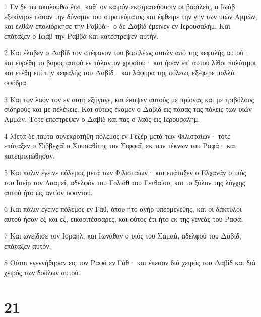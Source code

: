 \par 1 Εν δε τω ακολούθω έτει, καθ' ον καιρόν εκστρατεύουσιν οι βασιλείς, ο Ιωάβ εξεκίνησε πάσαν την δύναμιν του στρατεύματος και έφθειρε την γην των υιών Αμμών, και ελθών επολιόρκησε την Ραββά· ο δε Δαβίδ έμεινεν εν Ιερουσαλήμ. Και επάταξεν ο Ιωάβ την Ραββά και κατέστρεψεν αυτήν.
\par 2 Και έλαβεν ο Δαβίδ τον στέφανον του βασιλέως αυτών από της κεφαλής αυτού· και ευρέθη το βάρος αυτού εν τάλαντον χρυσίου· και ήσαν επ' αυτού λίθοι πολύτιμοι και ετέθη επί την κεφαλής του Δαβίδ· και λάφυρα της πόλεως εξέφερε πολλά σφόδρα.
\par 3 Και τον λαόν τον εν αυτή εξήγαγε, και έκοψεν αυτούς με πρίονας και με τριβόλους σιδηρούς και με πελέκεις. Και ούτως έκαμεν ο Δαβίδ εις πάσας τας πόλεις των υιών Αμμών. Τότε επέστρεψεν ο Δαβίδ και πας ο λαός εις Ιερουσαλήμ.
\par 4 Μετά δε ταύτα συνεκροτήθη πόλεμος εν Γεζέρ μετά των Φιλισταίων· τότε επάταξεν ο Σιββεχαΐ ο Χουσαθίτης τον Σιφφαΐ, εκ των τέκνων του Ραφά· και κατετροπώθησαν.
\par 5 Και πάλιν έγεινε πόλεμος μετά των Φιλισταίων· και επάταξεν ο Ελχανάν ο υιός του Ιαείρ τον Λααμεί, αδελφόν του Γολιάθ του Γετθαίου, και το ξύλον της λόγχης αυτού ήτο ως αντίον υφαντού.
\par 6 Και πάλιν έγεινε πόλεμος εν Γαθ, όπου ήτο ανήρ υπερμεγέθης, και οι δάκτυλοι αυτού ήσαν εξ και εξ, εικοσιτέσσαρες, και ούτος έτι ήτο εκ της γενεάς του Ραφά.
\par 7 Και ωνείδισε τον Ισραήλ, και Ιωνάθαν ο υιός του Σαμαά, αδελφού του Δαβίδ, επάταξεν αυτόν.
\par 8 Ούτοι εγεννήθησαν εις τον Ραφά εν Γάθ· και έπεσον διά χειρός του Δαβίδ και διά χειρός των δούλων αυτού.

\chapter{21}

